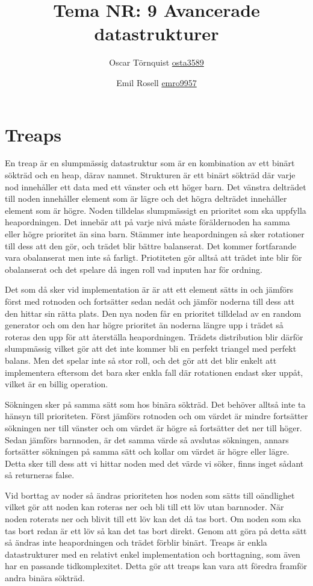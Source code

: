 \documentclass[a5paper,10pt,oneside]{article}
\title{Tema NR: 9 Avancerade datastrukturer}
\author{Oscar Törnquist \url{osta3589} \and Emil Rosell \url{emro9957}}
\begin{document}
\maketitle

\section*{Treaps}

En treap är en slumpmässig datastruktur som är en kombination av ett binärt sökträd och en heap, därav namnet. Strukturen är ett binärt sökträd där varje nod innehåller ett data med ett vänster och ett höger barn. Det vänstra delträdet till noden innehåller element som är lägre och det högra delträdet innehåller element som är högre. Noden tilldelas slumpmässigt en prioritet som ska uppfylla heapordningen. Det innebär att på varje nivå måste föräldernoden ha samma eller högre prioritet än sina barn. Stämmer inte heapordningen så sker rotationer till dess att den gör, och trädet blir bättre balanserat. Det kommer fortfarande vara obalanserat men inte så farligt. Priotiteten gör alltså att trädet inte blir för obalanserat och det spelare då ingen roll vad inputen har för ordning.

Det som då sker vid implementation är är att ett element sätts in och jämförs först med rotnoden och fortsätter sedan nedåt och jämför noderna till dess att den hittar sin rätta plats. Den nya noden får en prioritet tilldelad av en random generator och om den har högre prioritet än noderna längre upp i trädet så roteras den upp för att återställa heapordningen. Trädets distribution blir därför slumpmässig vilket gör att det inte kommer bli en perfekt triangel med perfekt balans. Men det spelar inte så stor roll, och det gör att det blir enkelt att implementera eftersom det bara sker enkla fall där rotationen endast sker uppåt, vilket är en billig operation. 

Sökningen sker på samma sätt som hos binära sökträd. Det behöver alltså inte ta hänsyn till prioriteten. Först jämförs rotnoden och om värdet är mindre fortsätter sökningen ner till vänster och om värdet är högre så fortsätter det ner till höger. Sedan jämförs barnnoden, är det samma värde så avslutas sökningen, annars fortsätter sökningen på samma sätt och kollar om värdet är högre eller lägre. Detta sker till dess att vi hittar noden med det värde vi söker, finns inget sådant så returneras false.

Vid borttag av noder så ändras prioriteten hos noden som sätts till oändlighet vilket gör att noden kan roteras ner och bli till ett löv utan barnnoder. När noden roterats ner och blivit till ett löv kan det då tas bort. Om noden som ska tas bort redan är ett löv så kan det tas bort direkt. Genom att göra på detta sätt så ändras inte heapordningen och trädet förblir binärt. Treaps är enkla datastrukturer med en relativt enkel implementation och borttagning, som även har en passande tidkomplexitet. Detta gör att treaps kan vara att föredra framför andra binära sökträd.  
\end{document}

